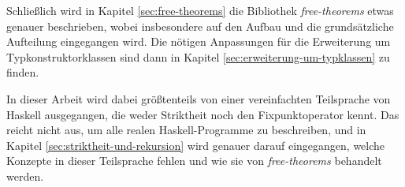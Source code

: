 


Schließlich wird in Kapitel \ref{sec:free-theorems} die Bibliothek \textit{free-theorems} etwas genauer beschrieben, wobei
insbesondere auf den Aufbau und die grundsätzliche Aufteilung eingegangen wird. Die nötigen Anpassungen für die Erweiterung um
Typkonstruktorklassen sind dann in Kapitel \ref{sec:erweiterung-um-typklassen} zu finden.

In dieser Arbeit wird dabei größtenteils von einer vereinfachten Teilsprache von Haskell ausgegangen, die weder Striktheit noch den Fixpunktoperator kennt. Das reicht nicht aus, um alle realen Haskell-Programme zu beschreiben, und in Kapitel \ref{sec:striktheit-und-rekursion}
wird genauer darauf eingegangen, welche Konzepte in dieser Teilsprache fehlen und wie sie von \textit{free-theorems} behandelt
werden.

